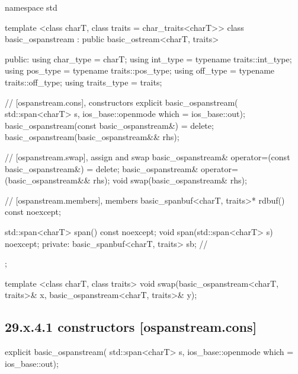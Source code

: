 \documentclass[ebook,11pt,article]{memoir}
\renewcommand{\iref}[1]{[#1]}
\begin{document}
\begin{codeblock}
namespace std {
  template <class charT, class traits = char_traits<charT>>
  class basic_ospanstream
    : public basic_ostream<charT, traits> {
  public:
    using char_type      = charT;
    using int_type       = typename traits::int_type;
    using pos_type       = typename traits::pos_type;
    using off_type       = typename traits::off_type;
    using traits_type    = traits;

    // \iref{ospanstream.cons}, constructors
    explicit basic_ospanstream(
      std::span<charT> s,
      ios_base::openmode which = ios_base::out);
    basic_ospanstream(const basic_ospanstream&) = delete;
    basic_ospanstream(basic_ospanstream&& rhs);

    // \iref{ospanstream.swap}, assign and swap
    basic_ospanstream& operator=(const basic_ospanstream&) = delete;
    basic_ospanstream& operator=(basic_ospanstream&& rhs);
    void swap(basic_ospanstream& rhs);

    // \iref{ospanstream.members}, members
    basic_spanbuf<charT, traits>* rdbuf() const noexcept;

    std::span<charT> span() const noexcept;
    void span(std::span<charT> s) noexcept;
  private:
    basic_spanbuf<charT, traits> sb; // \expos
  };

  template <class charT, class traits>
    void swap(basic_ospanstream<charT, traits>& x,
              basic_ospanstream<charT, traits>& y);
}
\end{codeblock}


\subsection{29.x.4.1  constructors [ospanstream.cons]}
\label{ospanstream.cons}

\begin{itemdecl}
explicit basic_ospanstream(
  std::span<charT> s,
  ios_base::openmode which = ios_base::out);
\end{itemdecl}
\end{document}
